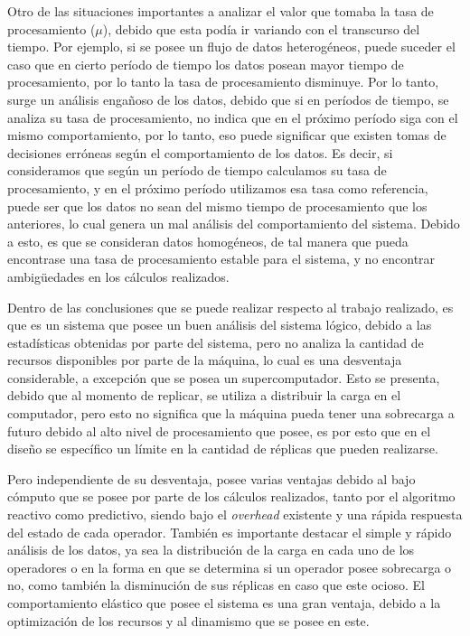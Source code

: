 Otro de las situaciones importantes a analizar el valor que tomaba la tasa de procesamiento ($\mu$), debido que esta podía ir variando con el transcurso del tiempo. Por ejemplo, si se posee un flujo de datos heterogéneos, puede suceder el caso que en cierto período de tiempo los datos posean mayor tiempo de procesamiento, por lo tanto la tasa de procesamiento disminuye. Por lo tanto, surge un análisis engañoso de los datos, debido que si en períodos de tiempo, se analiza su tasa de procesamiento, no indica que en el próximo período siga con el mismo comportamiento, por lo tanto, eso puede significar que existen tomas de decisiones erróneas según el comportamiento de los datos. Es decir, si consideramos que según un período de tiempo calculamos su tasa de procesamiento, y en el próximo período utilizamos esa tasa como referencia, puede ser que los datos no sean del mismo tiempo de procesamiento que los anteriores, lo cual genera un mal análisis del comportamiento del sistema. Debido a esto, es que se consideran datos homogéneos, de tal manera que pueda encontrase una tasa de procesamiento estable para el sistema, y no encontrar ambigüedades en los cálculos realizados.

Dentro de las conclusiones que se puede realizar respecto al trabajo realizado, es que es un sistema que posee un buen análisis del sistema lógico, debido a las estadísticas obtenidas por parte del sistema, pero no analiza la cantidad de recursos disponibles por parte de la máquina, lo cual es una desventaja considerable, a excepción que se posea un supercomputador. Esto se presenta, debido que al momento de replicar, se utiliza a distribuir la carga en el computador, pero esto no significa que la máquina pueda tener una sobrecarga a futuro debido al alto nivel de procesamiento que posee, es por esto que en el diseño se específico un límite en la cantidad de réplicas que pueden realizarse.

Pero independiente de su desventaja, posee varias ventajas debido al bajo cómputo que se posee por parte de los cálculos realizados, tanto por el algoritmo reactivo como predictivo, siendo bajo el \textit{overhead} existente y una rápida respuesta del estado de cada operador. También es importante destacar el simple y rápido análisis de los datos, ya sea la distribución de la carga en cada uno de los operadores o en la forma en que se determina si un operador posee sobrecarga o no, como también la disminución de sus réplicas en caso que este ocioso. El comportamiento elástico que posee el sistema es una gran ventaja, debido a la optimización de los recursos y al dinamismo que se posee en este.

